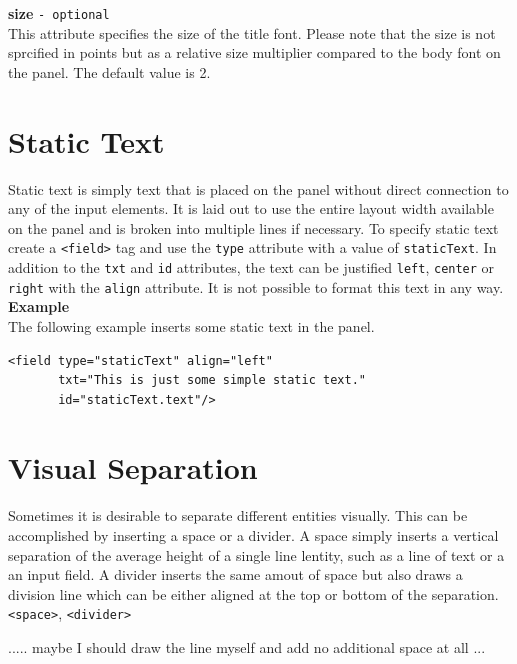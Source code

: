\textbf{size} \texttt{- optional}\\

This attribute specifies the size of the title font. Please note that
the size is not sprcified in points but as a relative size multiplier
compared to the body font on the panel. The default value is 2.\\

\section{Static Text}

Static text is simply text that is placed on the panel without direct
connection to any of the input elements. It is laid out to use the
entire layout width available on the panel and is broken into multiple
lines if necessary. To specify static text create a \texttt{<field>} tag
and use the \texttt{type} attribute with a value of \texttt{staticText}.
In addition to the \texttt{txt} and \texttt{id} attributes, the text can
be justified \texttt{left}, \texttt{center} or \texttt{right} with the
\texttt{align} attribute. It is not possible to format this text in any way.\\

\textbf{Example}\\

The following example inserts some static text in the panel.

\footnotesize
\begin{verbatim}
<field type="staticText" align="left" 
       txt="This is just some simple static text."
       id="staticText.text"/>
\end{verbatim}
\normalsize

\section{Visual Separation}

Sometimes it is desirable to separate different entities visually. This
can be accomplished by inserting a space or a divider. A space simply
inserts a vertical separation of the average height of a single line
lentity, such as a line of text or a an input field. A divider inserts
the same amout of space but also draws a division line which can be
either aligned at the top or bottom of the separation.
\texttt{<space>}, \texttt{<divider>}

 ..... maybe I should draw the line myself and add no additional space at all ...


